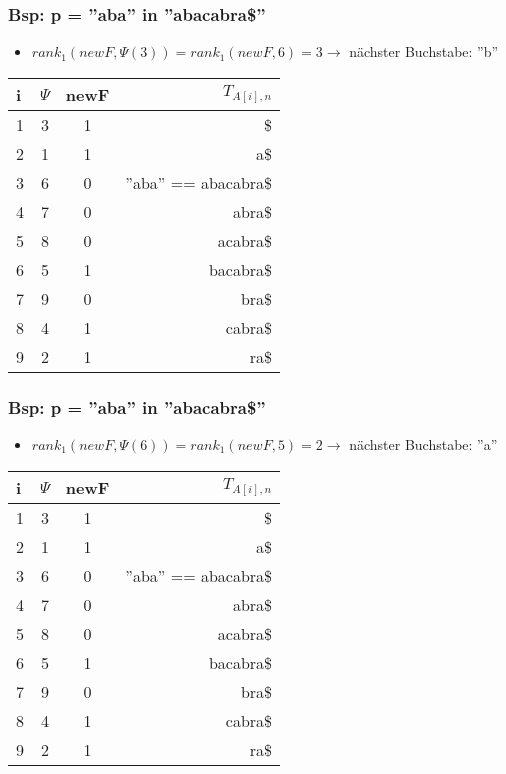 \documentclass{beamer}
\begin{document}
\begin{frame}
\frametitle{Bsp: p = ''aba'' in ''abacabra\$''}
\begin{itemize}
\item $rank_1(newF, \Psi(3)) = rank_1(newF, 6) = 3 \rightarrow$ nächster Buchstabe: ''b''
\end{itemize}
\begin{tabular}{l<{\ttfamily}|c<{\ttfamily}c<{\ttfamily} r<{\ttfamily}}
i & $\Psi$ & newF & $T_{A[i],n}$ \\\hline
1 & 3 & 1 &\$\\
2 & 1 & 1 &a\$\\
3 & 6 & 0 &''\color{red}ab\color{gray}a\color{black}'' == \color{red}ab\color{gray}acabra\$\\
4 & 7 & 0 &abra\$\\
5 & 8 & 0 & acabra\$\\
\color{gray}6 & \color{gray}5 & \color{gray}1 &\color{gray}bacabra\$\\
\color{gray}7 & \color{gray}9 & \color{gray}0 &\color{gray}bra\$\\
\color{gray}8 &\color{gray} 4 & \color{gray}1 &\color{gray}cabra\$\\
\color{gray}9 & \color{gray}2 & \color{gray}1 &\color{gray}ra\$\\
\end{tabular}
\end{frame}

\begin{frame}
\frametitle{Bsp: p = ''aba'' in ''abacabra\$''}
\begin{itemize}
\item $rank_1(newF, \Psi(6)) = rank_1(newF, 5) = 2 \rightarrow$ nächster Buchstabe: ''a''
\end{itemize}
\begin{tabular}{l<{\ttfamily}|c<{\ttfamily}c<{\ttfamily} r<{\ttfamily}}
i & $\Psi$ & newF & $T_{A[i],n}$ \\\hline
1 & 3 & 1 &\$\\
2 & 1 & 1 &a\$\\
3 & 6 & 0 &''\color{red}aba\color{black}'' == \color{red}aba\color{gray}cabra\$\\
4 & 7 & 0 &abra\$\\
5 & 8 & 0 & acabra\$\\
\color{gray}6 & \color{gray}5 & \color{gray}1 &\color{gray}bacabra\$\\
\color{gray}7 & \color{gray}9 & \color{gray}0 &\color{gray}bra\$\\
\color{gray}8 &\color{gray} 4 & \color{gray}1 &\color{gray}cabra\$\\
\color{gray}9 & \color{gray}2 & \color{gray}1 &\color{gray}ra\$\\
\end{tabular}
\end{frame}
\end{document}
